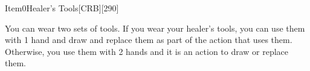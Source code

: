 
\begin{card}{Item}{0}{Healer's Tools}[CRB][290]


You can wear two sets of tools.
If you wear your healer's tools, you can use them with 1 hand and draw and replace them as part of the action that uses them.
Otherwise, you use them with 2 hands and it is an action to draw or replace them.


\vfill

\end{card}
